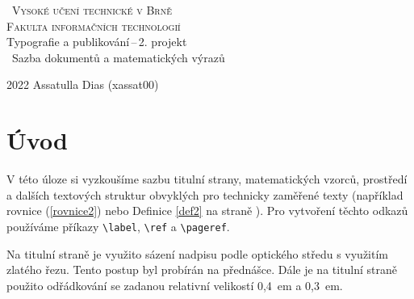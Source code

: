 \documentclass[11pt,a4paper,twocolumn]{article}
\date{}
\begin{document}
    \begin{titlepage}
        \begin{center}
            \textsc{\Huge ~Vysoké učení technické v Brně \\[0.4em]
            \huge{Fakulta informačních technologií}}\\
            {\LARGE Typografie a publikování\,--\,2. projekt\\[0.3em]
            ~Sazba dokumentů a matematických výrazů}
        \end{center}
        {\Large 2022 \hfill Assatulla Dias (xassat00)}
    \end{titlepage}
    
    \section*{Úvod} \label{uvod}
    V této úloze si vyzkoušíme sazbu titulní strany, matematických vzorců, prostředí a dalších textových struktur obvyklých pro technicky zaměřené texty (například rovnice (\ref{rovnice2}) nebo Definice \ref{def2} na straně \pageref{uvod}). Pro vytvoření těchto odkazů používáme příkazy \verb|\label|, \verb|\ref| a \verb|\pageref|. 
    
    Na titulní straně je využito sázení nadpisu podle optického středu s využitím zlatého řezu. Tento postup byl probírán na přednášce. Dále je na titulní straně použito odřádkování se zadanou relativní velikostí 0,4~em a 0,3~em.
\end{document}
